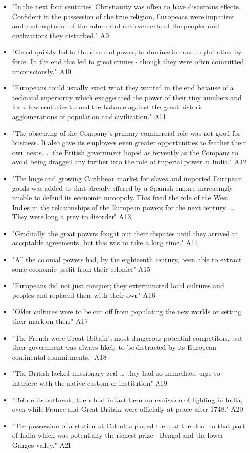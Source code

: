 \documentclass[letterpaper]{article}
\begin{document}
\begin{itemize}
\begin{itemize}
\item "In the next four centuries, Christianity was often to have
disastrous effects. Confident in the possession of the true
religion, Europeans were impatient and contemptuous of the values
and achievements of the peoples and civilizations they disturbed."
A9
\item "Greed quickly led to the abuse of power, to domination and
exploitation by force. In the end this led to great crimes - though
they were often committed unconsciously." A10
\item "Europeans could usually exact what they wanted in the end because
of a technical superiority which exaggerated the power of their tiny
numbers and for a few centuries turned the balance against the great
historic agglomerations of population and civilization." A11
\item "The obscuring of the Company's primary commercial role was not good
for business. It also gave its employees even greater opportunities
to feather their own nests. \ldots{} the British government hoped as
fervently as the Company to avoid being dragged any further into the
role of imperial power in India." A12
\item "The huge and growing Caribbean market for slaves and imported
European goods was added to that already offered by a Spanish empire
increasingly unable to defend its economic monopoly. This fixed the
role of the West Indies in the relationships of the European powers
for the next century. \ldots{} They were long a prey to disorder" A13
\item "Gradually, the great powers fought out their disputes until they
arrived at acceptable agreements, but this was to take a long time."
A14
\item "All the colonial powers had, by the eighteenth century, been able
to extract some economic profit from their colonies" A15
\item "Europeans did not just conquer; they exterminated local cultures
and peoples and replaced them with their own" A16
\item "Older cultures were to be cut off from populating the new worlds or
setting their mark on them" A17
\item "The French were Great Britain's most dangerous potential
competitors, but their government was always likely to be distracted
by its European continental commitments." A18
\item "The British lacked missionary zeal \ldots{} they had no immediate urge
to interfere with the native custom or institution" A19
\item "Before its outbreak, there had in fact been no remission of
fighting in India, even while France and Great Britain were
officially at peace after 1748." A20
\item "The possession of a station at Calcutta placed them at the door to
that part of India which was potentially the richest prize - Bengal
and the lower Ganges valley." A21
\end{itemize}


\end{itemize}
\end{document}
